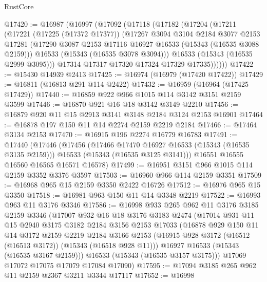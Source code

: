 \begin{lexlean}{RustCore}
\begin{coremodule}
@17420 := @16987
    (@16997
      (@17092
        (@17118
          (@17182
            (@17204
              (@17211
                (@17221
                  (@17225 (@17372 @17377))
                  (@17267
                    @3094
                    @3104
                    @2184
                    @3077
                    @2153
                    @17281
                    (@17290 @3087 @2153 @17116 @16927 @16533 (@15343 (@16535 @3088 @2159)))
                    @16533
                    (@15343 (@16535 @3078 @3094)))
                  @16533
                  (@15343 (@16535 @2999 @3095)))
                @17314
                @17317
                @17320
                @17324
                @17329
                @17335))))))
@17422 := @15430 @14939 @2413
@17425 := @16974 (@16979 (@17420 @17422))
@17429 := @16811 (@16813 @291 @114 @2422)
@17432 := @16959 (@16964 (@17425 @17429))
@17440 := @16859 @922 @966 @1015 @114 @3142 @3151 @2159 @3599
@17446 := @16870 @921 @16 @18 @3142 @3149 @2210
@17456 := @16879 @920 @11 @15 @2913 @3141 @3148 @2184 @3124 @2153 @16901
@17464 := @16878 @197 @150 @11 @14 @2274 @2159 @2219 @2184
@17466 := @17464 @3134 @2153
@17470 := @16915 @196 @2274 @16779 @16783
@17491 := @17440
    (@17446
      (@17456
        (@17466 @17470 @16927 @16533 (@15343 (@16535 @3135 @2159)))
        @16533
        (@15343 (@16535 @3125 @3141)))
      @16551
      @16555
      @16560
      @16565
      @16571
      @16578)
@17499 := @16951 @3151 @966 @1015 @114 @2159 @3352 @3376 @3597
@17503 := @16960 @966 @114 @2159 @3351
@17509 := @16968 @965 @15 @2159 @3350 @2422 @16726
@17512 := @16976 @965 @15 @3350
@17518 := @16981 @963 @150 @11 @14 @3348 @2219
@17522 := @16993 @963 @11 @3176 @3346
@17586 := @16998
    @933
    @265
    @962
    @11
    @3176
    @3185
    @2159
    @3346
    (@17007
      @932
      @16
      @18
      @3176
      @3183
      @2474
      (@17014
        @931
        @11
        @15
        @2940
        @3175
        @3182
        @2184
        @3156
        @2153
        @17033
        (@16878
          @929
          @150
          @11
          @14
          @3172
          @2159
          @2219
          @2184
          @3166
          @2153
          (@16915 @928 @3172 (@16512 (@16513 @3172)) (@15343 (@16518 @928 @11)))
          @16927
          @16533
          (@15343 (@16535 @3167 @2159)))
        @16533
        (@15343 (@16535 @3157 @3175)))
      @17069
      @17072
      @17075
      @17079
      @17084
      @17090)
@17595 := @17094 @3185 @265 @962 @11 @2159 @2367 @3211 @3344 @17117
@17652 := @16998

\end{coremodule}
\end{lexlean}
